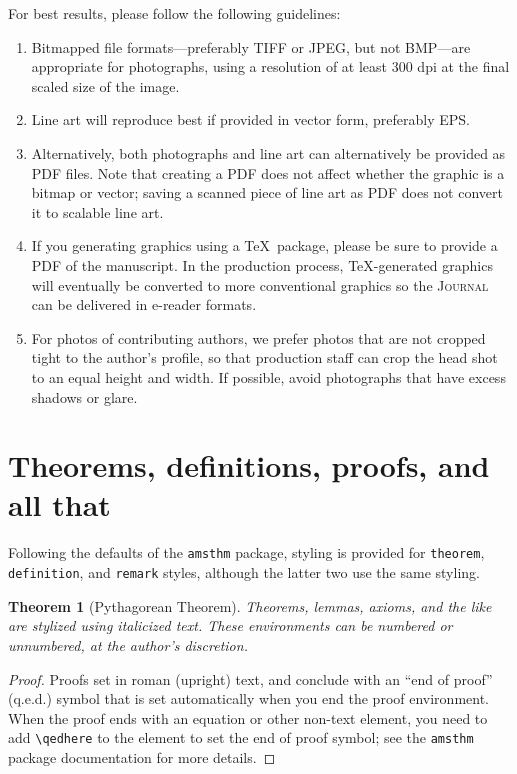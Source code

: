 \documentclass{article}
\theoremstyle{theorem}
\newtheorem{theorem}{Theorem}
\theoremstyle{definition}
\begin{document}
For best results, please follow the following guidelines:
\begin{enumerate}
\item Bitmapped file formats---preferably TIFF or JPEG, but not BMP---are appropriate for photographs, using a resolution of at least 300 dpi at the final scaled size of the image.
\item Line art will reproduce best if provided in vector form, preferably EPS.
\item Alternatively, both photographs and line art can alternatively be provided as PDF files.  Note that creating a PDF does not affect whether the graphic is a bitmap or vector; saving a scanned piece of line art as PDF does not convert it to scalable line art.
\item If you generating graphics using a \TeX\ package, please be sure to provide a PDF of the manuscript.  In the production process, \TeX-generated graphics will eventually be converted to more conventional graphics so the \textsc{Journal} can be delivered in e-reader formats.
\item For photos of contributing authors, we prefer photos that are not cropped tight to the author's profile, so that production staff can crop the head shot to an equal height and width.  If possible, avoid photographs that have excess shadows or glare.
\end{enumerate}

\section{Theorems, definitions, proofs, and all that}

Following the defaults of the \texttt{amsthm} package, styling is provided for \texttt{theorem}, \texttt{definition}, and \texttt{remark} styles, although the latter two use the same styling.

\begin{theorem}[Pythagorean Theorem]
Theorems, lemmas, axioms, and the like are stylized using italicized text. These environments can be numbered or unnumbered, at the author's discretion.
\end{theorem}

\begin{proof}
Proofs set in roman (upright) text, and conclude with an ``end of proof'' (q.e.d.) symbol that is set automatically when you end the proof environment.  When the proof ends with an equation or other non-text element, you need to add \verb~\qedhere~ to the element to set the end of proof symbol; see the \texttt{amsthm} package documentation for more details.
\end{proof}
\end{document}
